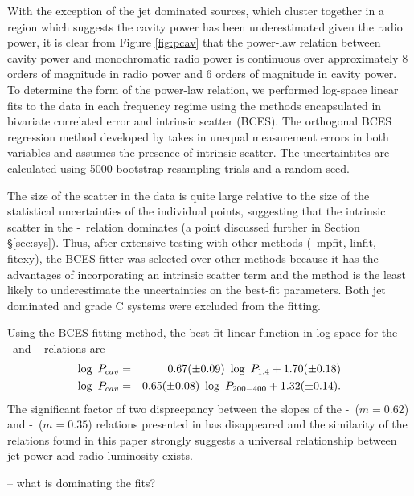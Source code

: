 \documentclass{emulateapj}
\begin{document}
With the exception of the jet dominated sources, which cluster
together in a region which suggests the cavity power has been
underestimated given the radio power, it is clear from Figure
\ref{fig:pcav} that the power-law relation between cavity power and
monochromatic radio power is continuous over approximately 8 orders of
magnitude in radio power and 6 orders of magnitude in cavity power. To
determine the form of the power-law relation, we performed log-space
linear fits to the data in each frequency regime using the methods
encapsulated in bivariate correlated error and intrinsic scatter
(BCES). The orthogonal BCES regression method developed by
\citet{bces} takes in unequal measurement errors in both variables and
assumes the presence of intrinsic scatter. The uncertaintites are
calculated using 5000 bootstrap resampling trials and a random seed.

The size of the scatter in the data is quite large relative to the
size of the statistical uncertainties of the individual points,
suggesting that the intrinsic scatter in the \pcav-\prad\ relation
dominates (a point discussed further in Section
\S\ref{sec:sys}). Thus, after extensive testing with other methods
(\ie\ mpfit, linfit, fitexy), the BCES fitter was selected over other
methods because it has the advantages of incorporating an intrinsic
scatter term and the method is the least likely to underestimate the
uncertainties on the best-fit parameters. Both jet dominated and grade
C systems were excluded from the fitting.

Using the {\textsc{BCES}} fitting method, the best-fit linear function
in log-space for the \pcav-\phigh\ and \pcav-\plow\ relations are
\begin{eqnarray}
\log~P_{cav} &=& 0.67 (\pm 0.09)~\log~P_{\mathrm{1.4}} + 1.70 (\pm 0.18)\\
\log~P_{cav} &=& 0.65 (\pm 0.08)~\log~P_{\mathrm{200-400}} + 1.32 (\pm 0.14).
\end{eqnarray}
The significant factor of two disprecpancy between the slopes of the
\pcav-\phigh\ ($m = 0.62$) and \pcav-\pthree\ ($m = 0.35$) relations
presented in \citet{birzan08} has disappeared and the similarity of
the relations found in this paper strongly suggests a universal
relationship between jet power and radio luminosity exists.

-- what is dominating the fits?\\
\end{document}
